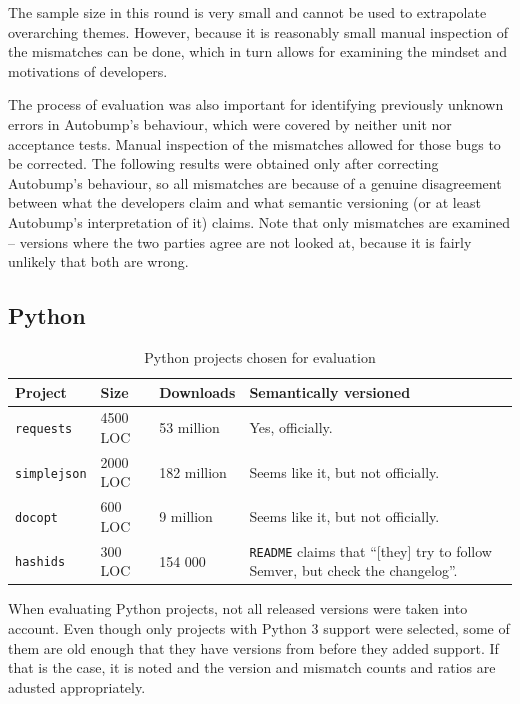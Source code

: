 \documentclass{l4proj}
\newcommand\genericstyle{\lstset{basicstyle=\ttm}}
\newcommand\codeinline[1]{{\genericstyle\lstinline!#1!}}
\begin{document}
The sample size in this round is very small and cannot be used to
extrapolate overarching themes. However, because it is reasonably
small manual inspection of the mismatches can be done, which in turn
allows for examining the mindset and motivations of developers.

The process of evaluation was also important for identifying
previously unknown errors in Autobump's behaviour, which were covered
by neither unit nor acceptance tests. Manual inspection of the
mismatches allowed for those bugs to be corrected. The following
results were obtained only after correcting Autobump's behaviour, so
all mismatches are because of a genuine disagreement between what the
developers claim and what semantic versioning (or at least Autobump's
interpretation of it) claims. Note that only mismatches are examined
-- versions where the two parties agree are not looked at, because it
is fairly unlikely that both are wrong.


\subsection{Python}

\begin{table}[H]
\centering
\caption{Python projects chosen for evaluation}
\label{PythonProjectsForEvaluation}
\begin{tabular}{|l|l|l|p{10cm}|}
\hline
\textbf{Project} & \textbf{Size} & \textbf{Downloads} & \textbf{Semantically versioned} \\
\hline
\codeinline{requests} & 4500 LOC & 53 million & Yes, officially. \\
\codeinline{simplejson} & 2000 LOC & 182 million & Seems like it, but not officially. \\
\codeinline{docopt} & 600 LOC & 9 million & Seems like it, but not
officially. \\
\codeinline{hashids} & 300 LOC & 154 000 & \codeinline{README} claims
that ``[they] try to follow Semver, but check the changelog''. \\
\hline
\end{tabular}
\end{table}

When evaluating Python projects, not all released versions were taken
into account. Even though only projects with Python 3 support were
selected, some of them are old enough that they have versions from
before they added support. If that is the case, it is noted and the
version and mismatch counts and ratios are adusted appropriately.
\end{document}
